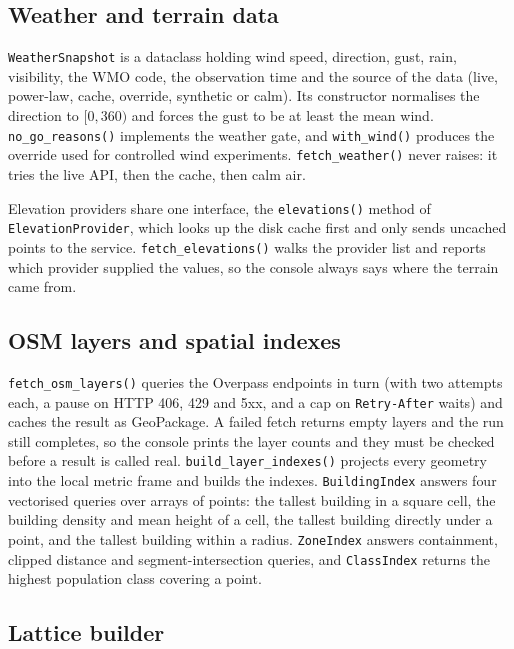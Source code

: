 \documentclass{ssnreview}
\begin{document}
\subsection{Weather and terrain data}

\texttt{WeatherSnapshot} is a dataclass holding wind speed, direction, gust, rain,
visibility, the WMO code, the observation time and the source of the data (live,
power-law, cache, override, synthetic or calm). Its constructor normalises the direction
to $[0, 360)$ and forces the gust to be at least the mean wind. \texttt{no\_go\_reasons()}
implements the weather gate, and \texttt{with\_wind()} produces the override used for
controlled wind experiments. \texttt{fetch\_weather()} never raises: it tries the live API,
then the cache, then calm air.

Elevation providers share one interface, the \texttt{elevations()} method of
\texttt{ElevationProvider}, which looks up the disk cache first and only sends uncached points to the service.
\texttt{fetch\_elevations()} walks the provider list and reports which provider supplied
the values, so the console always says where the terrain came from.

\subsection{OSM layers and spatial indexes}

\texttt{fetch\_osm\_layers()} queries the Overpass endpoints in turn (with two attempts each,
a pause on HTTP 406, 429 and 5xx, and a cap on \texttt{Retry-After} waits) and caches the
result as GeoPackage. A failed fetch returns empty layers and the run still completes, so
the console prints the layer counts and they must be checked before a result is called
real. \texttt{build\_layer\_indexes()} projects every geometry into the local metric frame
and builds the indexes. \texttt{BuildingIndex} answers four vectorised queries over arrays
of points: the tallest building in a square cell, the building density and mean height of
a cell, the tallest building directly under a point, and the tallest building within a
radius. \texttt{ZoneIndex} answers containment, clipped distance and segment-intersection
queries, and \texttt{ClassIndex} returns the highest population class covering a point.

\subsection{Lattice builder}
\end{document}
